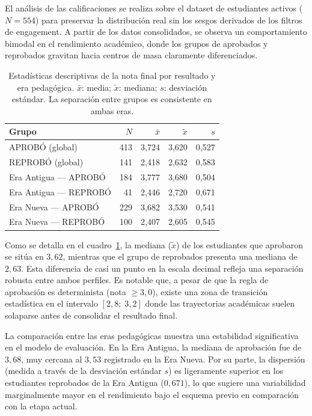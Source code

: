 \documentclass[12pt, letterpaper, openany]{report}
\begin{document}
El análisis de las calificaciones se realiza sobre el dataset de estudiantes activos ($N = 554$) para preservar la distribución real sin los sesgos derivados de los filtros de engagement. A partir de los datos consolidados, se observa un comportamiento bimodal en el rendimiento académico, donde los grupos de aprobados y reprobados gravitan hacia centros de masa claramente diferenciados.

\begin{table}[!ht] %
  \centering
  \caption{Estadísticas descriptivas de la nota final por resultado y era pedagógica. $\bar{x}$: media; $\tilde{x}$: mediana; $s$: desviación estándar. La separación entre grupos es consistente en ambas eras.}
  \label{tab:desc_nota}
  \small
  \setlength{\tabcolsep}{4pt} 
  \begin{tabularx}{\textwidth}{Xrrrr}
    \toprule
    Grupo & $N$ & $\bar{x}$ & $\tilde{x}$ & $s$ \\
    \midrule
    APROBÓ (global)        & 413 & 3,724 & 3,620 & 0,527 \\ \addlinespace
    REPROBÓ (global)       & 141 & 2,418 & 2,632 & 0,583 \\
    \midrule
    Era Antigua --- APROBÓ & 184 & 3,777 & 3,680 & 0,504 \\ \addlinespace
    Era Antigua --- REPROBÓ&  41 & 2,446 & 2,720 & 0,671 \\ \addlinespace
    Era Nueva --- APROBÓ   & 229 & 3,682 & 3,530 & 0,541 \\ \addlinespace
    Era Nueva --- REPROBÓ  & 100 & 2,407 & 2,605 & 0,545 \\
    \bottomrule
  \end{tabularx}
\end{table}

Como se detalla en el cuadro~\ref{tab:desc_nota}, la mediana ($\tilde{x}$) de los estudiantes que aprobaron se sitúa en $3{,}62$, mientras que el grupo de reprobados presenta una mediana de $2{,}63$. Esta diferencia de casi un punto en la escala decimal refleja una separación robusta entre ambos perfiles. Es notable que, a pesar de que la regla de aprobación es determinista (nota $\geq 3{,}0$), existe una zona de transición estadística en el intervalo $[2{,}8;\;3{,}2]$ donde las trayectorias académicas suelen solaparse antes de consolidar el resultado final.

La comparación entre las eras pedagógicas muestra una estabilidad significativa en el modelo de evaluación. En la Era Antigua, la mediana de aprobación fue de $3{,}68$, muy cercana al $3{,}53$ registrado en la Era Nueva. Por su parte, la dispersión (medida a través de la desviación estándar $s$) es ligeramente superior en los estudiantes reprobados de la Era Antigua ($0{,}671$), lo que sugiere una variabilidad marginalmente mayor en el rendimiento bajo el esquema previo en comparación con la etapa actual.
\end{document}

